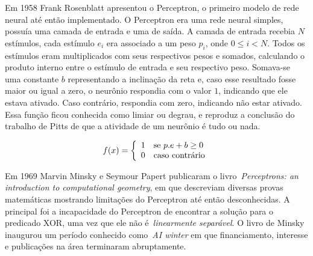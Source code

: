 Em 1958 Frank Rosenblatt apresentou o Perceptron, o primeiro modelo de rede neural até então implementado. O Perceptron era uma rede neural simples, possuía uma camada de entrada e uma de saída. A camada de entrada recebia $N$ estímulos, cada estímulo $e_i$ era associado a um peso $p_i$, onde $0 \leq i < N$. Todos os estímulos eram multiplicados com seus respectivos pesos e somados, calculando o produto interno entre o estímulo de entrada e seu respectivo peso. Somava-se uma constante $b$ representando a inclinação da reta e, caso esse resultado fosse maior ou igual a zero, o neurônio respondia com o valor $1$, indicando que ele estava ativado. Caso contrário, respondia com zero, indicando não estar ativado. Essa função ficou conhecida como limiar ou degrau, e reproduz a conclusão do trabalho de Pitts de que a atividade de um neurônio é tudo ou nada.

\begin{equation}
    f(x)=\left\{
    \begin{array}{c l}	
         1 & \text{se }p . e + b \geq 0 \\
         0 & \text{caso contrário}
    \end{array}\right. 
\end{equation}

Em 1969 Marvin Minsky e Seymour Papert publicaram o livro~\emph{Perceptrons: an introduction to computational geometry}, em que descreviam diversas provas matemáticas mostrando limitações do Perceptron até então desconhecidas. A principal foi a incapacidade do Perceptron de encontrar a solução para o predicado XOR, uma vez que ele não é~\emph{linearmente separável}.  O livro de Minsky inaugurou um período conhecido como~\emph{AI winter} em que financiamento, interesse e publicações na área terminaram abruptamente.

